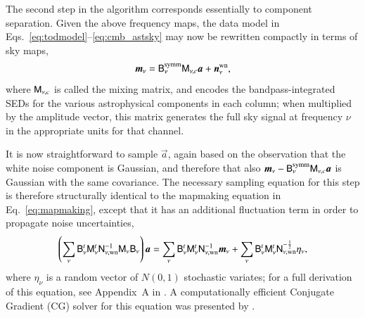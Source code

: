 \documentclass[twocolumn]{aa}
\newcommand{\n}[0]{\vec{n}}
\renewcommand{\a}[0]{\vec{a}}
\newcommand{\m}[0]{\vec{m}}
\newcommand{\B}[0]{\tens{B}}
\newcommand{\N}[0]{\tens{N}}
\newcommand{\M}[0]{\tens{M}}
\begin{document}
The second step in the algorithm corresponds essentially to component
separation. Given the above frequency maps, the data model in
Eqs.~\eqref{eq:todmodel}--\eqref{eq:cmb_astsky} may now be rewritten
compactly in terms of sky maps,
\begin{equation}
  \m_{\nu} = \B^{\mathrm{symm}}_{\nu}\M_{\nu,c}\a + \n^{\mathrm{wn}}_{\nu},
  \label{eq:mapmodel}
\end{equation}
where $\M_{\nu,c}$ is called the mixing matrix, and encodes the
bandpass-integrated SEDs for the various astrophysical components in
each column; when multiplied by the amplitude vector, this matrix
generates the full sky signal at frequency $\nu$ in the appropriate
units for that channel.

It is now straightforward to sample $\a$, again based on the
observation that the white noise component is Gaussian, and therefore
that also $\m_{\nu}-\B^{\mathrm{symm}}_{\nu}\M_{\nu,c}\a$ is Gaussian
with the same covariance. The necessary sampling equation for this
step is therefore structurally identical to the mapmaking equation in
Eq.~\eqref{eq:mapmaking}, except that it has an additional fluctuation
term in order to propagate noise uncertainties,
\begin{equation}
  \left(\sum_{\nu}\B_\nu^t\M_\nu^t\N^{-1}_{\nu,\mathrm{wn}}\M_\nu\B_\nu\right)\a
  = \sum_\nu \B_{\nu}^t\M_{\nu}^t\N_{\nu,\mathrm{wn}}^{-1}\m_{\nu} +
  \sum_{\nu}
  \B_{\nu}^t\M_{\nu}^t\N_{\nu,\mathrm{wn}}^{-\frac{1}{2}}\eta_{\nu},
  \label{eq:compsep}
\end{equation}
where $\eta_{\nu}$ is a random vector of $N(0,1)$ stochastic variates;
for a full derivation of this equation, see Appendix~A in
\citet{bp01}. A computationally efficient Conjugate Gradient (CG)
solver for this equation was presented by \citet{seljebotn:2019}.
\end{document}
